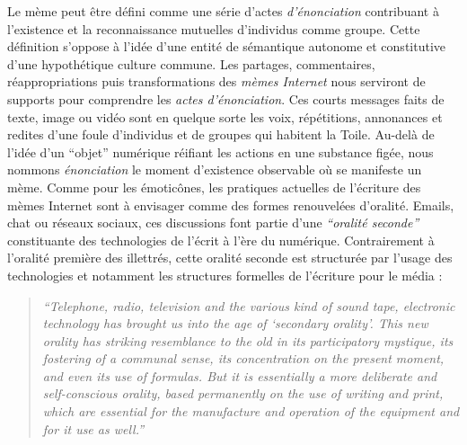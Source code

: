  
Le mème peut être défini comme une série d{\textquoteright}actes \textit{d{\textquoteright}énonciation} contribuant à l{\textquoteright}existence et la reconnaissance mutuelles d{\textquoteright}individus comme groupe. Cette définition s{\textquoteright}oppose à l'idée d{\textquoteright}une entité de sémantique autonome et constitutive d{\textquoteright}une hypothétique culture commune. Les partages, commentaires, réappropriations puis transformations des \textit{mèmes Internet }nous serviront de supports pour comprendre les \textit{actes d{\textquoteright}énonciation}. Ces courts messages faits de texte, image ou vidéo sont en quelque sorte les voix, répétitions, annonances et redites d{\textquoteright}une foule d{\textquoteright}individus et de groupes qui habitent la Toile. Au-delà de l{\textquoteright}idée d{\textquoteright}un {\textquotedblleft}objet{\textquotedblright} numérique réifiant les actions en une substance figée, nous nommons \textit{énonciation} le moment d{\textquoteright}existence observable o\`u se manifeste un mème. Comme pour les émoticônes, les pratiques actuelles de l{\textquoteright}écriture des mèmes Internet sont à envisager comme des formes renouvelées d{\textquoteright}oralité. Emails, chat ou réseaux sociaux, ces discussions font partie d{\textquoteright}une \textit{{\textquotedblleft}oralité seconde{\textquotedblright} }\citep{Ong1988} constituante des technologies de l{\textquoteright}écrit à l{\textquoteright}ère du numérique. Contrairement à l{\textquoteright}oralité première des illettrés, cette oralité seconde est structurée par l{\textquoteright}usage des technologies et notamment les structures formelles de l{\textquoteright}écriture pour le média :  

\begin{quote}
    \textit{``Telephone, radio, television and the various kind of sound tape, electronic technology has brought us into the age of {\textquoteleft}secondary orality{\textquoteright}. This new orality has striking resemblance to the old in its participatory mystique, its fostering of a communal sense, its concentration on the present moment, and even its use of formulas. But it is essentially a more deliberate and self-conscious orality, based permanently on the use of writing and print, which are essential for the manufacture and operation of the equipment and for it use as well.''} 
\citep{Ong1988}
\end{quote}

